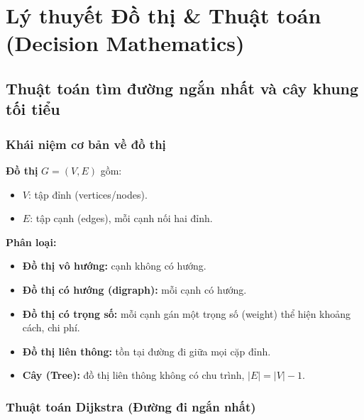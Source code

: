 \documentclass[12pt,a4paper]{article}
\begin{document}
\section{Lý thuyết Đồ thị \& Thuật toán (Decision Mathematics)}

\subsection{Thuật toán tìm đường ngắn nhất và cây khung tối tiểu}

\subsubsection{Khái niệm cơ bản về đồ thị}

\begin{dinhnghia}[title={Đồ thị (Graph)}]
  \textbf{Đồ thị} $G = (V, E)$ gồm:
  \begin{itemize}
    \item $V$: tập đỉnh (vertices/nodes).
    \item $E$: tập cạnh (edges), mỗi cạnh nối hai đỉnh.
  \end{itemize}
  \textbf{Phân loại:}
  \begin{itemize}
    \item \textbf{Đồ thị vô hướng:} cạnh không có hướng.
    \item \textbf{Đồ thị có hướng (digraph):} mỗi cạnh có hướng.
    \item \textbf{Đồ thị có trọng số:} mỗi cạnh gán một trọng số (weight) thể hiện khoảng cách, chi phí.
    \item \textbf{Đồ thị liên thông:} tồn tại đường đi giữa mọi cặp đỉnh.
    \item \textbf{Cây (Tree):} đồ thị liên thông không có chu trình, $|E| = |V| - 1$.
  \end{itemize}
\end{dinhnghia}

\subsubsection{Thuật toán Dijkstra (Đường đi ngắn nhất)}
\end{document}
